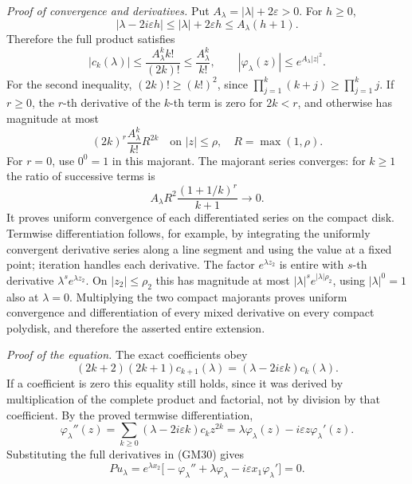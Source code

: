 \documentclass[
  11pt,
]{article}
\begin{document}
\emph{Proof of convergence and derivatives.} Put
\(A_\lambda=|\lambda|+2\varepsilon>0\). For \(h\geq0\),
\[
 |\lambda-2i\varepsilon h|
 \leq|\lambda|+2\varepsilon h
 \leq A_\lambda(h+1).
\] Therefore the full product satisfies
\[
 |c_k(\lambda)|\leq\frac{A_\lambda^k k!}{(2k)!}
                     \leq\frac{A_\lambda^k}{k!},
 \qquad |\varphi_\lambda(z)|\leq e^{A_\lambda|z|^2}.
 \tag{GM35}
\] For the second inequality,
\((2k)!\geq(k!)^2\), since \(\prod_{j=1}^k(k+j)\geq\prod_{j=1}^k j\). If
\(r\geq0\), the \(r\)-th derivative
of the \(k\)-th term is zero for
\(2k<r\), and otherwise has magnitude at most
\[
 (2k)^r\frac{A_\lambda^k}{k!}R^{2k}
 \quad\text{on }|z|\leq\rho,\quad R=\max(1,\rho).
\] For \(r=0\), use
\(0^0=1\) in this majorant. The majorant series
converges: for \(k\geq1\) the ratio of successive terms
is \[
 A_\lambda R^2\frac{(1+1/k)^r}{k+1}\longrightarrow0.
\] It proves uniform convergence of each
differentiated series on the compact disk. Termwise differentiation
follows, for example, by integrating the uniformly convergent derivative
series along a line segment and using the value at a fixed point;
iteration handles each derivative. The factor \(e^{\lambda z_2}\)
is entire with \(s\)-th derivative
\(\lambda^s e^{\lambda z_2}\). On \(|z_2|\leq\rho_2\) this has
magnitude at most \(|\lambda|^s e^{|\lambda|\rho_2}\), using
\(|\lambda|^0=1\) also at \(\lambda=0\).
Multiplying the two compact majorants proves uniform convergence and
differentiation of every mixed derivative on every compact polydisk, and
therefore the asserted entire extension.

\emph{Proof of the equation.} The exact coefficients obey
\[
 (2k+2)(2k+1)c_{k+1}(\lambda)
           =(\lambda-2i\varepsilon k)c_k(\lambda).
 \tag{GM36}
\] If a coefficient is zero this equality still
holds, since it was derived by multiplication of the complete product
and factorial, not by division by that coefficient. By the proved
termwise differentiation, \[
 \varphi_\lambda''(z)
   =\sum_{k\geq0}(\lambda-2i\varepsilon k)c_k z^{2k}
   =\lambda\varphi_\lambda(z)-i\varepsilon z\varphi_\lambda'(z).
 \tag{GM37}
\] Substituting the
full derivatives in (GM30) gives \[
 Pu_\lambda=e^{\lambda x_2}
       \big[-\varphi_\lambda''+\lambda\varphi_\lambda
                         -i\varepsilon x_1\varphi_\lambda'\big]=0.
 \tag{GM38}
\]
\end{document}
